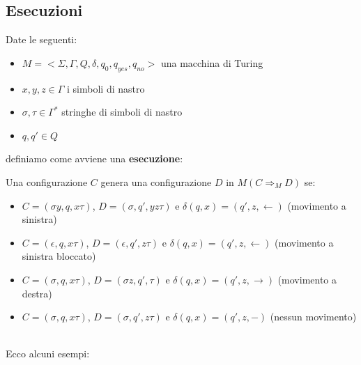 \subsection{Esecuzioni}
Date le seguenti:
\begin{itemize}[label=--]
    \item $M = <\Sigma, \Gamma,Q,\delta,q_0,q_{yes},q_{no}>$ una macchina di Turing
    \item $x,y,z \in \Gamma$ i simboli di nastro
    \item $\sigma,\tau \in \Gamma^*$ stringhe di simboli di nastro
    \item $q,q'\in Q$
\end{itemize}
definiamo come avviene una \textbf{esecuzione}: \smallskip\\
\colorbox{SALZO}{\parbox{\dimexpr\linewidth-2\fboxsep}{\begin{definition}
   Una configurazione $C$ genera una configurazione $D$ in $M (C \Rightarrow_M D)$ se:
   \begin{itemize}
    \item $C = (\sigma y, q, x\tau)$, $D = (\sigma, q', yz\tau)$ e $\delta(q,x) = (q',z,\leftarrow)$ (movimento a sinistra)
    \item $C = (\epsilon, q, x\tau)$, $D = (\epsilon, q', z\tau)$ e $\delta(q,x) = (q',z,\leftarrow)$ (movimento a sinistra bloccato)
    \item $C = (\sigma, q, x\tau)$, $D = (\sigma z, q', \tau)$ e $\delta(q,x) = (q',z,\rightarrow)$ (movimento a destra)
    \item $C = (\sigma, q, x\tau)$, $D = (\sigma, q', z\tau)$ e $\delta(q,x) = (q',z,-)$ (nessun movimento)
   \end{itemize}
\end{definition}}}\smallskip\\
Ecco alcuni esempi:
